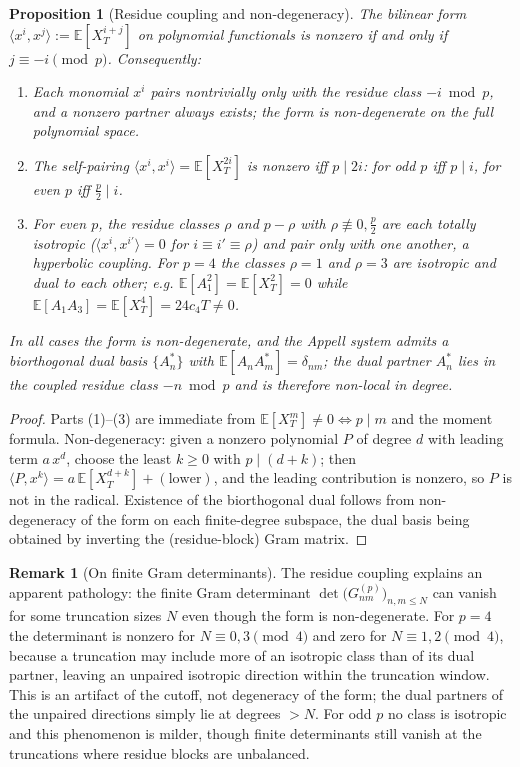 \documentclass[11pt,reqno]{amsart}
\theoremstyle{plain}
\newtheorem{proposition}[theorem]{Proposition}
\theoremstyle{definition}
\newtheorem{remark}[theorem]{Remark}
\newcommand{\E}{\mathbb{E}}
\begin{document}
\begin{proposition}[Residue coupling and non-degeneracy]
\label{prop:residue}
The bilinear form $\langle x^i, x^j \rangle := \E[X_T^{i+j}]$ on polynomial functionals is nonzero if and only if $j \equiv -i \pmod p$. Consequently:
\begin{enumerate}
\item Each monomial $x^i$ pairs nontrivially only with the residue class $-i \bmod p$, and a nonzero partner always exists; the form is non-degenerate on the full polynomial space.
\item The self-pairing $\langle x^i, x^i\rangle = \E[X_T^{2i}]$ is nonzero iff $p \mid 2i$: for odd $p$ iff $p \mid i$, for even $p$ iff $\tfrac{p}{2} \mid i$.
\item For even $p$, the residue classes $\rho$ and $p-\rho$ with $\rho \not\equiv 0, \tfrac{p}{2}$ are each totally isotropic ($\langle x^i, x^{i'}\rangle = 0$ for $i \equiv i' \equiv \rho$) and pair only with one another, a hyperbolic coupling. For $p=4$ the classes $\rho=1$ and $\rho=3$ are isotropic and dual to each other; e.g. $\E[A_1^2] = \E[X_T^2] = 0$ while $\E[A_1 A_3] = \E[X_T^4] = 24 c_4 T \neq 0$.
\end{enumerate}
In all cases the form is non-degenerate, and the Appell system admits a biorthogonal dual basis $\{A_n^\ast\}$ with $\E[A_n A_m^\ast] = \delta_{nm}$; the dual partner $A_n^\ast$ lies in the coupled residue class $-n \bmod p$ and is therefore non-local in degree.
\end{proposition}

\begin{proof}
Parts (1)--(3) are immediate from $\E[X_T^m] \neq 0 \iff p \mid m$ and the moment formula. Non-degeneracy: given a nonzero polynomial $P$ of degree $d$ with leading term $a\,x^d$, choose the least $k \geq 0$ with $p \mid (d+k)$; then $\langle P, x^k\rangle = a\,\E[X_T^{d+k}] + (\text{lower})$, and the leading contribution is nonzero, so $P$ is not in the radical. Existence of the biorthogonal dual follows from non-degeneracy of the form on each finite-degree subspace, the dual basis being obtained by inverting the (residue-block) Gram matrix.
\end{proof}

\begin{remark}[On finite Gram determinants]
\label{rem:gram-trunc}
The residue coupling explains an apparent pathology: the finite Gram determinant $\det\bigl(G^{(p)}_{nm}\bigr)_{n,m \leq N}$ can vanish for some truncation sizes $N$ even though the form is non-degenerate. For $p=4$ the determinant is nonzero for $N \equiv 0,3 \pmod 4$ and zero for $N \equiv 1,2 \pmod 4$, because a truncation may include more of an isotropic class than of its dual partner, leaving an unpaired isotropic direction within the truncation window. This is an artifact of the cutoff, not degeneracy of the form; the dual partners of the unpaired directions simply lie at degrees $> N$. For odd $p$ no class is isotropic and this phenomenon is milder, though finite determinants still vanish at the truncations where residue blocks are unbalanced.
\end{remark}
\end{document}

